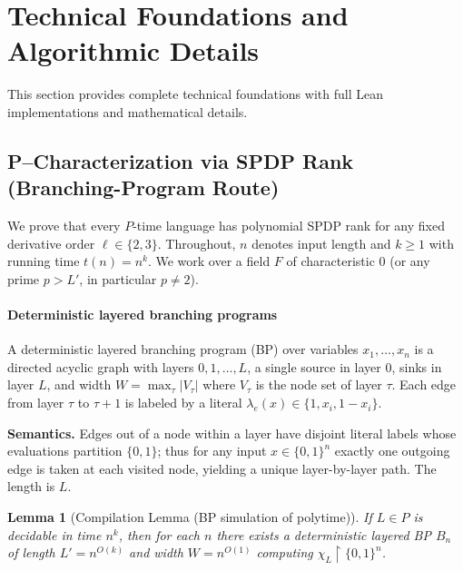 \documentclass[12pt]{article}
\newtheorem{lemma}[theorem]{Lemma}
\theoremstyle{definition}
\theoremstyle{definition}
\theoremstyle{remark}
\theoremstyle{remark}
\begin{document}
\section{Technical Foundations and Algorithmic Details}
\label{sec:technical-foundations}

This section provides complete technical foundations with full Lean implementations and mathematical details.

\subsection{P--Characterization via SPDP Rank (Branching-Program Route)}
\label{sec:p-characterization-bp}

We prove that every $P$-time language has polynomial SPDP rank for any fixed derivative order $\ell \in \{2,3\}$. Throughout, $n$ denotes input length and $k \geq 1$ with running time $t(n) = n^k$. We work over a field $F$ of characteristic 0 (or any prime $p > L'$, in particular $p \neq 2$).

\paragraph{Deterministic layered branching programs}

A deterministic layered branching program (BP) over variables $x_1, \ldots, x_n$ is a directed acyclic graph with layers $0, 1, \ldots, L$, a single source in layer $0$, sinks in layer $L$, and width $W = \max_\tau |V_\tau|$ where $V_\tau$ is the node set of layer $\tau$. Each edge from layer $\tau$ to $\tau+1$ is labeled by a literal $\lambda_e(x) \in \{1, x_i, 1-x_i\}$.

\textbf{Semantics.} Edges out of a node within a layer have disjoint literal labels whose evaluations partition $\{0,1\}$; thus for any input $x \in \{0,1\}^n$ exactly one outgoing edge is taken at each visited node, yielding a unique layer-by-layer path. The length is $L$.

\begin{lemma}[Compilation Lemma (BP simulation of polytime)]
\label{lem:bp-compilation}
If $L \in P$ is decidable in time $n^k$, then for each $n$ there exists a deterministic layered BP $B_n$ of length $L' = n^{O(k)}$ and width $W = n^{O(1)}$ computing $\chi_L \!\restriction\! \{0,1\}^n$.
\end{lemma}
\end{document}
